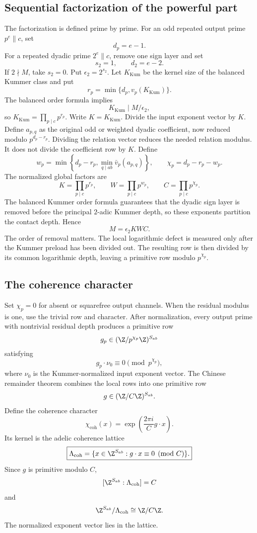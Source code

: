 \subsection{Sequential factorization of the powerful part}
The factorization is defined prime by prime. For an odd repeated output prime $p^e\parallel c$, set
\[
 d_p=e-1.
\]
For a repeated dyadic prime $2^e\parallel c$, remove one sign layer and set
\[
 s_2=1,
 \qquad
 d_2=e-2.
\]
If $2\nmid M$, take $s_2=0$. Put $\epsilon_2=2^{s_2}$. Let $K_{\mathrm{Kum}}$ be the kernel size of the balanced Kummer class and put
\[
 r_p=\min\{d_p,v_p(K_{\mathrm{Kum}})\}.
\]
The balanced order formula implies
\[
 K_{\mathrm{Kum}}\mid M/\epsilon_2,
\]
so $K_{\mathrm{Kum}}=\prod_{p\mid c}p^{r_p}$. Write $K=K_{\mathrm{Kum}}$. Divide the input exponent vector by $K$. Define $a_{p,q}$ as the original odd or weighted dyadic coefficient, now reduced modulo $p^{d_p-r_p}$. Dividing the relation vector reduces the needed relation modulus. It does not divide the coefficient row by $K$. Define
\[
 w_p
 =
 \min\left
 \{
 d_p-r_p,
 \min_{q\mid ab}\bar v_p(a_{p,q})
 \right\},
 \qquad
 \chi_p=d_p-r_p-w_p.
\]
The normalized global factors are
\[
 K=\prod_{p\mid c}p^{r_p},
 \qquad
 W=\prod_{p\mid c}p^{w_p},
 \qquad
 C=\prod_{p\mid c}p^{\chi_p}.
\]
The balanced Kummer order formula guarantees that the dyadic sign layer is removed before the principal $2$-adic Kummer depth, so these exponents partition the contact depth. Hence
\[
 \boxed{
 M=\epsilon_2KWC.
 }
\]
The order of removal matters. The local logarithmic defect is measured only after the Kummer preload has been divided out. The resulting row is then divided by its common logarithmic depth, leaving a primitive row modulo $p^{\chi_p}$.

\subsection{The coherence character}
Set $\chi_p=0$ for absent or squarefree output channels. When the residual modulus is one, use the trivial row and character. After normalization, every output prime with nontrivial residual depth produces a primitive row
\[
 g_p
 \in
 (\Z/p^{\chi_p}\Z)^{S_{ab}}
\]
satisfying
\[
 g_p\cdot\nu_0
 \equiv0
 \pmod{p^{\chi_p}},
\]
where $\nu_0$ is the Kummer-normalized input exponent vector. The Chinese remainder theorem combines the local rows into one primitive row
\[
 g\in(\Z/C\Z)^{S_{ab}}.
\]
Define the coherence character
\[
 \boxed{
 \chi_{\mathrm{coh}}(x)
 =
 \exp\left(\frac{2\pi i}{C}g\cdot x\right).
 }
\]
Its kernel is the adelic coherence lattice
\[
 \boxed{
 \Lambda_{\mathrm{coh}}
 =
 \{x\in\Z^{S_{ab}}:g\cdot x\equiv0\pmod C\}.
 }
\]
Since $g$ is primitive modulo $C$,
\[
 [\Z^{S_{ab}}:\Lambda_{\mathrm{coh}}]=C
\]
and
\[
 \Z^{S_{ab}}/\Lambda_{\mathrm{coh}}\cong\Z/C\Z.
\]
The normalized exponent vector lies in the lattice.

